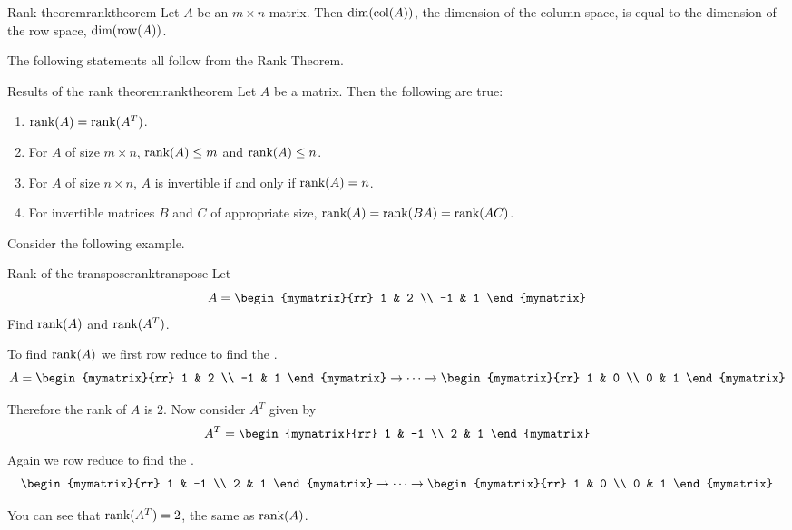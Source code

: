 \begin{theorem}{Rank theorem}{ranktheorem}
Let $A$ be an $m \times n$ matrix. Then $\mbox{dim}(\mbox{col} (A))$, the dimension of the column space, is equal to the dimension of the row space, $\mbox{dim}(\mbox{row}(A))$.
\end{theorem}

The following statements all follow from the Rank Theorem.

\begin{corollary}{Results of the rank theorem}{ranktheorem}
Let $A$ be a matrix. Then the following are true:
\begin{enumerate}
\item
 $\mbox{rank}(A) = \mbox{rank}(A^T)$.
\item
For $A$ of size $m \times n$, $\mbox{rank}(A) \leq m$ and $\mbox{rank}(A) \leq n$.
\item
For $A$ of size $n \times n$,  $A$ is invertible if and only if $\mbox{rank}(A) = n$.
\item
For invertible matrices $B$ and $C$ of appropriate size, 
$\mbox{rank}(A) = \mbox{rank}(BA) = \mbox{rank}(AC)$. 
\end{enumerate}
\end{corollary}

Consider the following example.

\begin{example}{Rank of the transpose}{ranktranspose}
Let \[
A = 
\begin{mymatrix}{rr}
1 & 2 \\
-1 & 1 
\end{mymatrix}
\]
Find $\mbox{rank}(A)$ and $\mbox{rank}(A^T)$.
\end{example}

\begin{solution}
To find $\mbox{rank}(A)$ we first row reduce to find the {\rref}.
\[
A = 
\begin{mymatrix}{rr}
1 & 2 \\
-1 & 1 
\end{mymatrix}
\rightarrow \cdots \rightarrow
\begin{mymatrix}{rr}
1 & 0 \\
0 & 1 
\end{mymatrix}
\]

Therefore the rank of $A$ is $2$. Now consider $A^T$ given by 
\[
A^T = \begin{mymatrix}{rr}
1 & -1 \\
2 & 1 
\end{mymatrix}
\]
Again we row reduce to find the {\rref}.
\[
\begin{mymatrix}{rr}
1 & -1 \\
2 & 1 
\end{mymatrix}
\rightarrow \cdots \rightarrow
\begin{mymatrix}{rr}
1 & 0 \\
0 & 1 
\end{mymatrix}
\]

You can see that $\mbox{rank}(A^T) = 2$, the same as $\mbox{rank}(A)$. 
\end{solution}

